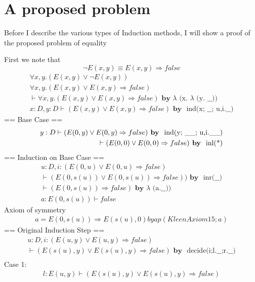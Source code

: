 \documentclass{article}
\newcommand{\tab}{\hspace*{2em}}
\begin{document}
\section{A proposed problem}

Before I describe the various types of Induction methods, I will show a proof of the proposed problem of equality

First we note that 
\[\neg E(x,y) \equiv E(x,y) \Rightarrow false\]
\begin{eqnarray}
\forall x, y. (E(x,y) \vee \neg E(x,y))\nonumber\\
\forall x, y. (E(x,y) \vee E(x,y) \Rightarrow false) \nonumber\\
\vdash \forall x, y. (E(x,y) \vee E(x,y) \Rightarrow false) \textbf{ by } \text{$\lambda$ (x. $\lambda$ (y. \_\_))}\\
x:D, y:D \vdash (E(x,y) \vee E(x,y) \Rightarrow false) \textbf{ by } \text{ ind(x; \_\_; u,i.\_\_)}
\end{eqnarray}
== Base Case == 
\begin{eqnarray}
y:D \vdash (E(0,y) \vee E(0,y) \Rightarrow false) \textbf{ by } \text{ ind(y; \_\_; u,i.\_\_)}\\
\tab \vdash (E(0,0) \vee E(0,0) \Rightarrow false) \nonumber \textbf{ by } \text{ inl(*)}
\end{eqnarray}
== Induction on Base Case == 
\begin{eqnarray}
u:D, i:(E(0,u) \vee E(0,u) \Rightarrow false)\nonumber\\ \vdash (E(0,s(u)) \vee E(0,s(u)) \Rightarrow false)) \textbf{ by } \text{ inr(\_\_)}\\
\vdash (E(0,s(u)) \Rightarrow false) \textbf{ by } \text{$\lambda$ (a.\_\_))}\\
a:E(0,s(u)) \vdash false
\end{eqnarray}
Axiom of symmetry
\begin{eqnarray}
a = E(0,s(u)) \Rightarrow E(s(u),0) by ap(Kleen Axiom 15; a)
\end{eqnarray}
== Original Induction Step ==
\begin{eqnarray}
u:D, i:(E(u,y) \vee E(u,y) \Rightarrow false)\nonumber\\ \vdash (E(s(u),y) \vee E(s(u),y) \Rightarrow false) \textbf{ by } \text{ decide(i;l.\_\_;r.\_\_)}\\
\end{eqnarray}
Case 1: 
\begin{eqnarray}
l:E(u, y) \vdash (E(s(u),y) \vee E(s(u),y) \Rightarrow false)
\end{eqnarray}
\end{document}
